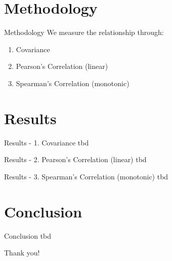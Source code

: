 \documentclass[11pt]{beamer}
\begin{document}

\section{Methodology}
\begin{frame}{Methodology}
We measure the relationship through:
    
    \begin{enumerate}
        \item Covariance
        \item Pearson's Correlation (linear)
        \item Spearman's Correlation (monotonic)
    \end{enumerate}
\end{frame}

\section{Results}
\begin{frame}{Results - 1. Covariance}
    tbd
\end{frame}



\begin{frame}{Results - 2. Pearson’s Correlation (linear)}
    tbd
\end{frame}


\begin{frame}{Results - 3. Spearman’s Correlation (monotonic)}
    tbd
\end{frame}


\section{Conclusion}
\begin{frame}{Conclusion}
    tbd
\end{frame}


\begin{frame}

\begin{center}
    Thank you!
\end{center}

\end{frame}
\end{document}

